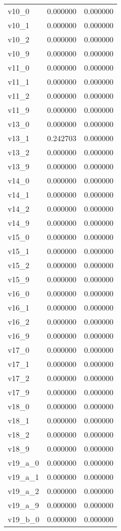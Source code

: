 \begin{tabular}{lrr}
v10_0 & 0.000000 & 0.000000 \\
v10_1 & 0.000000 & 0.000000 \\
v10_2 & 0.000000 & 0.000000 \\
v10_9 & 0.000000 & 0.000000 \\
v11_0 & 0.000000 & 0.000000 \\
v11_1 & 0.000000 & 0.000000 \\
v11_2 & 0.000000 & 0.000000 \\
v11_9 & 0.000000 & 0.000000 \\
v13_0 & 0.000000 & 0.000000 \\
v13_1 & 0.242703 & 0.000000 \\
v13_2 & 0.000000 & 0.000000 \\
v13_9 & 0.000000 & 0.000000 \\
v14_0 & 0.000000 & 0.000000 \\
v14_1 & 0.000000 & 0.000000 \\
v14_2 & 0.000000 & 0.000000 \\
v14_9 & 0.000000 & 0.000000 \\
v15_0 & 0.000000 & 0.000000 \\
v15_1 & 0.000000 & 0.000000 \\
v15_2 & 0.000000 & 0.000000 \\
v15_9 & 0.000000 & 0.000000 \\
v16_0 & 0.000000 & 0.000000 \\
v16_1 & 0.000000 & 0.000000 \\
v16_2 & 0.000000 & 0.000000 \\
v16_9 & 0.000000 & 0.000000 \\
v17_0 & 0.000000 & 0.000000 \\
v17_1 & 0.000000 & 0.000000 \\
v17_2 & 0.000000 & 0.000000 \\
v17_9 & 0.000000 & 0.000000 \\
v18_0 & 0.000000 & 0.000000 \\
v18_1 & 0.000000 & 0.000000 \\
v18_2 & 0.000000 & 0.000000 \\
v18_9 & 0.000000 & 0.000000 \\
v19_a_0 & 0.000000 & 0.000000 \\
v19_a_1 & 0.000000 & 0.000000 \\
v19_a_2 & 0.000000 & 0.000000 \\
v19_a_9 & 0.000000 & 0.000000 \\
v19_b_0 & 0.000000 & 0.000000 \\

\end{tabular}
